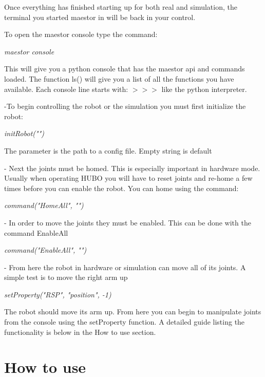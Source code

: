 \documentclass[12pt]{article}
\begin{document}
\noindent Once everything has finished starting up for both real and simulation, the terminal you started maestor in will be back in your control. 
	
\noindent To open the maestor console type the command:
		\begin{center}
			\textit{maestor console}
		\end{center}

This will give you a python console that has the maestor api and commands loaded. The function ls() will give you a list of all the functions you have available. Each console line starts with: $>>>$ like the python interpreter. 

	-To begin controlling the robot or the simulation you must first initialize the robot:
		
		\begin{center}
			\textit{initRobot("")}
		\end{center}          
		
		The parameter is the path to a config file. Empty string is default

	- Next the joints must be homed. This is especially important in hardware mode. Usually when operating HUBO you will have to reset joints and re-home a few times before you can enable the robot. You can home using the command:
		
		\begin{center}
			\textit{command("HomeAll", "")}
		\end{center}

    - In order to move the joints they must be enabled. This can be done with the command EnableAll
		\begin{center}
			\textit{command("EnableAll", "")}
		\end{center}
		

			
	- From here the robot in hardware or simulation can move all of its joints. A simple test is to move the right arm up 
		\begin{center}
			\textit{setProperty("RSP", "position", -1)}
		\end{center}
		 
		
\noindent 
The robot should move its arm up. From here you can begin to manipulate joints from the console using the setProperty function. A detailed guide listing the functionality is below in the How to use section.
	
\section{How to use}
\end{document}
